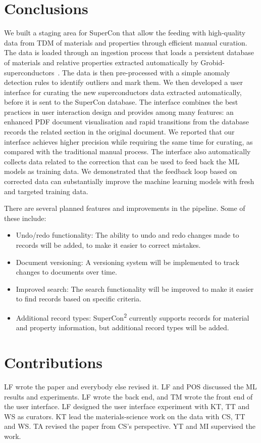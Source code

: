 \documentclass[a4paper]{article}
\begin{document}
\section{Conclusions}
We built a staging area for SuperCon that allow the feeding with high-quality data from TDM of materials and properties through efficient manual curation. 
The data is loaded through an ingestion process that loads a persistent database of materials and relative properties extracted automatically by Grobid-superconductors~\cite{lfoppiano2023automatic}. 
The data is then pre-processed with a simple anomaly detection rules to identify outliers and mark them.
We then developed a user interface for curating the new superconductors data extracted automatically, before it is sent to the SuperCon database. 
The interface combines the best practices in user interaction design and provides among many features: an enhanced PDF document visualisation and rapid transitions from the database records the related section in the original document. 
We reported that our interface achieves higher precision while requiring the same time for curating, as compared with the traditional manual process.
The interface also automatically collects data related to the correction that can be used to feed back the ML models as training data. 
We demonstrated that the feedback loop based on corrected data can substantially improve the machine learning models with fresh and targeted training data. 

There are several planned features and improvements in the pipeline. Some of these include:

\begin{itemize}
    \item Undo/redo functionality: The ability to undo and redo changes made to records will be added, to make it easier to correct mistakes.
    \item Document versioning: A versioning system will be implemented to track changes to documents over time.
    \item Improved search: The search functionality will be improved to make it easier to find records based on specific criteria.
    \item Additional record types: SuperCon\textsuperscript{2} currently supports records for material and property information, but additional record types will be added.
\end{itemize}

\section*{Contributions}
LF wrote the paper and everybody else revised it. 
LF and POS discussed the ML results and experiments. 
LF wrote the back end, and TM wrote the front end of the user interface. 
LF designed the user interface experiment with KT, TT and WS as curators.
KT lead the materials-science work on the data with CS, TT and WS.
TA revised the paper from CS's perspective.
YT and MI supervised the work. 




\end{document}
